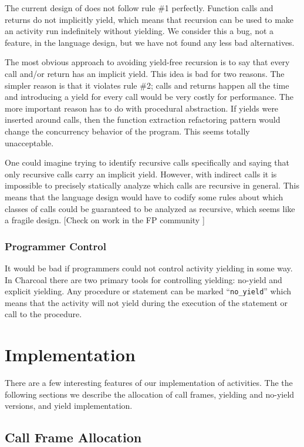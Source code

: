 \documentclass[10pt,preprint]{sigplanconf}
\begin{document}
The current design of \charcoal{} does not follow rule \#1 perfectly.
Function calls and returns do not implicitly yield, which means that recursion can be used to make an activity run indefinitely without yielding.
We consider this a bug, not a feature, in the language design, but we have not found any less bad alternatives.

The most obvious approach to avoiding yield-free recursion is to say that every call and/or return has an implicit yield.
This idea is bad for two reasons.
The simpler reason is that it violates rule \#2; calls and returns happen all the time and introducing a yield for every call would be very costly for performance.
The more important reason has to do with procedural abstraction.
If yields were inserted around calls, then the function extraction refactoring pattern would change the concurrency behavior of the program.
This seems totally unacceptable.

One could imagine trying to identify recursive calls specifically and saying that only recursive calls carry an implicit yield.
However, with indirect calls it is impossible to precisely statically analyze which calls are recursive in general.
This means that the language design would have to codify some rules about which classes of calls could be guaranteed to be analyzed as recursive, which seems like a fragile design.
[Check on work in the FP community ]

\subsubsection{Programmer Control}

It would be bad if programmers could not control activity yielding in some way.
In Charcoal there are two primary tools for controlling yielding: no-yield and explicit yielding.
Any procedure or statement can be marked ``\texttt{no\_yield}'' which means that the activity will not yield during the execution of the statement or call to the procedure.

\section{Implementation}

There are a few interesting features of our implementation of activities.
The the following sections we describe the allocation of call frames, yielding and no-yield versions, and yield implementation.

\subsection{Call Frame Allocation}
\end{document}

